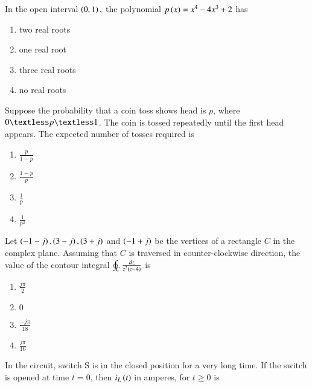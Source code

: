 \documentclass[journal]{IEEEtran}
\begin{document}
\begin{enumerate}
{{\begin{figure}[H]
\label{fig:my_label}
\end{figure}
}
\item{
In the open interval $\left(0,1\right),$ the polynomial $p\left(x\right)=x^4-4x^3+2$ has 
\begin{multicols}{4}
\begin{enumerate}
\item two real roots
\item one real root
\item three real roots
\item no real roots
\end{enumerate}
\end{multicols}
}
\item{
Suppose the probability that a coin toss shows head is $p$, where $0\textless p\textless 1$. The coin is tossed repeatedly until the first head appears. The expected number of tosses required is
\begin{multicols}{4}
\begin{enumerate}
\item $\frac{p}{1-p}$
\item $\frac{1-p}{p}$
\item $\frac{1}{p}$
\item $\frac{1}{p^2}$
\end{enumerate}
\end{multicols}
}
\item{
Let $\left(-1-j\right),\left(3-j\right),\left(3+j\right)$ and $\left(-1+j\right)$ be the vertices of a rectangle $C$ in the complex plane. Assuming that $C$ is traversed in counter-clockwise direction, the value of the contour integral $\oint_C\frac{dz}{z^2\left(z-4\right)}$ is
\begin{multicols}{4}
\begin{enumerate}
\item $\frac{j\pi}{2}$
\item $0$
\item $\frac{-j\pi}{18}$
\item $\frac{j\pi}{16}$
\end{enumerate}
\end{multicols}
}
\item{
In the circuit, switch S is in the closed position for a very long time. If the switch is opened at time $t=0$, then $i_L\left(t\right)$ in amperes, for $t\geq 0$ is
\begin{figure}[H]
\centering
{}
\end{figure}}}
\end{enumerate}
\end{document}
